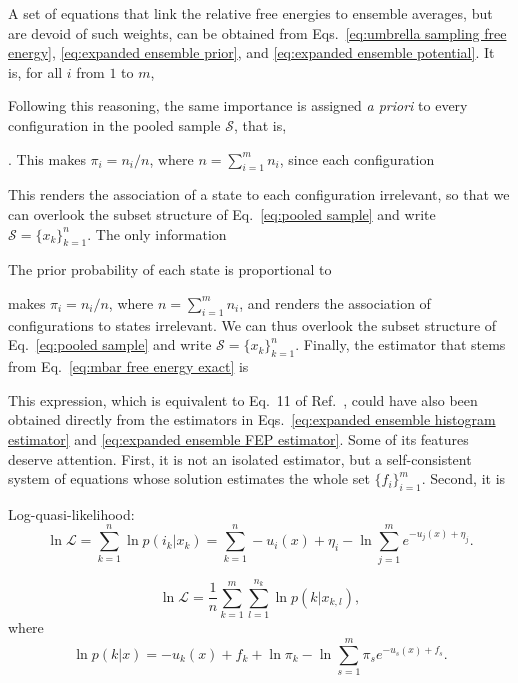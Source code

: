 \documentclass[aip,jcp,reprint,amsmath,amssymb]{revtex4-1}
\begin{document}
A set of equations that link the relative free energies to ensemble averages, but are devoid of such weights, can be obtained from Eqs.~\eqref{eq:umbrella sampling free energy}, \eqref{eq:expanded ensemble prior}, and \eqref{eq:expanded ensemble potential}. It is, for all $i$ from $1$ to $m$,





Following this reasoning, the same importance is assigned \textit{a priori} to every configuration in the pooled sample $\mathcal S$, that is, 


. This makes $\pi_i = n_i/n$, where $n = \sum_{i=1}^m n_i$, since each configuration 



This renders the association of a state to each configuration irrelevant, so that we can overlook the subset structure of Eq.~\eqref{eq:pooled sample} and write $\mathcal S = \{x_k\}_{k=1}^n$. The only information 

The prior probability of each state is proportional to 

makes $\pi_i = n_i/n$, where $n = \sum_{i=1}^m n_i$, and renders the association of configurations to states irrelevant. We can thus overlook the subset structure of Eq.~\eqref{eq:pooled sample} and write $\mathcal S = \{x_k\}_{k=1}^n$. Finally, the estimator that stems from Eq.~\eqref{eq:mbar free energy exact} is

This expression, which is equivalent to Eq.~11 of Ref.~, could have also been obtained directly from the estimators in Eqs.~\eqref{eq:expanded ensemble histogram estimator} and \eqref{eq:expanded ensemble FEP estimator}. Some of its features deserve attention. First, it is not an isolated estimator, but a self-consistent system of equations whose solution estimates the whole set $\{f_i\}_{i=1}^m$. Second, it is 

Log-quasi-likelihood:\cite{Geyer_1994}
\begin{equation*}
\ln \mathcal L = \sum_{k=1}^n \ln p(i_k|x_k) = \sum_{k=1}^n -u_i(x) + \eta_i - \ln \sum_{j=1}^m e^{-u_j(x) + \eta_j}.
\end{equation*}

\begin{equation}
\label{eq:mbar log quasi-likelihood}
\ln \mathcal L = \frac{1}{n} \sum_{k=1}^m \sum_{l=1}^{n_k} \ln p(k|x_{k,l}),
\end{equation}
where
\begin{equation*}
\ln p(k|x) = -u_k(x) + f_k + \ln \pi_k - \ln \sum_{s=1}^m \pi_s e^{-u_s(x) + f_s}.
\end{equation*}
\end{document}
